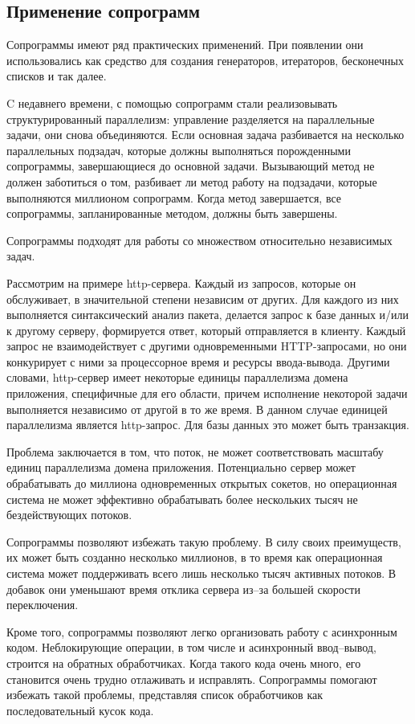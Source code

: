 	\subsection{Применение сопрограмм}
	Сопрограммы имеют ряд практических применений. При появлении они использовались как средство
	для создания генераторов, итераторов, бесконечных списков и так далее. 
	
	C недавнего времени, с помощью сопрограмм стали реализовывать структурированный параллелизм: 
	управление разделяется на параллельные задачи, они снова объединяются. 
	Если основная задача разбивается на несколько параллельных подзадач, которые должны выполняться
	порожденными сопрограммы, завершающиеся до основной задачи. Вызывающий
	метод не должен заботиться о том, разбивает ли метод работу на подзадачи, которые выполняются 
	миллионом сопрограмм. Когда метод завершается, все сопрограммы, запланированные методом, должны
	быть завершены.
	
	Сопрограммы подходят для работы со множеством относительно независимых задач.
	\par
	Рассмотрим на примере http-сервера. Каждый из запросов, которые он обслуживает, в значительной
	степени независим от других. Для каждого из них выполняется синтаксический анализ пакета, делается
	запрос к базе данных и/или к другому серверу, формируется ответ, который отправляется в клиенту. 
	Каждый запрос не взаимодействует с другими одновременными HTTP-запросами, но они конкурирует с ними за процессорное время и ресурсы ввода-вывода.
	Другими словами, http-сервер имеет некоторые единицы параллелизма домена приложения, 
	специфичные для его области, причем исполнение некоторой задачи выполняется независимо от другой в
	то же время. В данном случае единицей параллелизма является http-запрос. Для базы данных это может
	быть транзакция.
	\par
	Проблема заключается в том, что поток, не может соответствовать масштабу единиц параллелизма домена приложения.
	Потенциально сервер может обрабатывать до миллиона
	одновременных открытых сокетов, но операционная система не может эффективно обрабатывать более нескольких
	тысяч не бездействующих потоков.
	\par
	Сопрограммы позволяют избежать такую проблему. В силу своих преимуществ, их может быть
	созданно несколько миллионов, в то время как операционная система может поддерживать всего 
	лишь несколько тысяч активных потоков. В добавок они уменьшают время отклика сервера из--за
	большей скорости переключения.
	\par
	Кроме того, сопрограммы позволяют легко организовать работу с асинхронным кодом.
	Неблокирующие операции, в том числе и асинхронный ввод--вывод, строится на обратных обработчиках.
	Когда такого кода очень много, его становится очень трудно отлаживать и исправлять. Сопрограммы 
	помогают избежать такой проблемы, представляя список обработчиков как последовательный кусок кода.
	
\clearpage